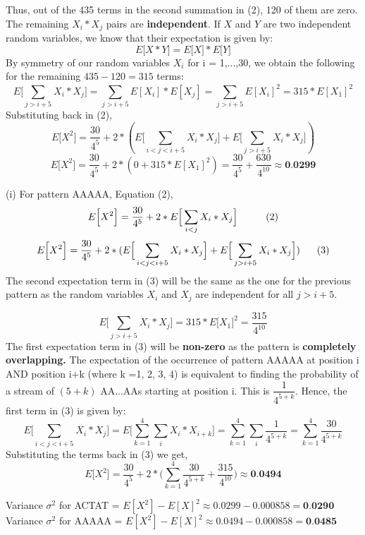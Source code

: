 \documentclass[solution,addpoints,12pt]{exam}
\begin{document}
\begin{questions}
\begin{parts}
\begin{solution}
Thus, out of the 435 terms in the second summation in (2), 120 of them are zero. The remaining $X_i*X_j$ pairs are \textbf{independent}. If $X$ and $Y$ are two independent random variables, we know that their expectation is given by:\\
$$E\Big[ X*Y\Big] = E\Big[X\Big]*E\Big[Y\Big]$$
By symmetry of our random variables $X_i$ for i = 1,...,30, we obtain the following for the remaining $435-120 = 315$ terms:
$$E\Big[ \sum_{j>i+5}{}^{} X_i*X_j] = \sum_{j>i+5}{} E[X_i]*E[X_j] = \sum_{j>i+5}^{} E[X_i]^2 = 315*E[X_1]^2$$
Substituting back in (2),
$$E\Big[ X^2\Big] = \dfrac{30}{4^5} + 2*(E\Big[\sum_{i < j < i + 5}{}^{} X_i*X_j\Big] + E\Big[\sum_{j>i+5}{}^{} X_i*X_j\Big])$$
$$E\Big[ X^2\Big] = \dfrac{30}{4^5} + 2*( 0 + 315*E[X_1]^2) = \dfrac{30}{4^5} + \dfrac{630}{4^{10}} \approx \textbf{0.0299}$$

(i) For pattern AAAAA,
Equation (2),
$$E\Big[X^2\Big] = \dfrac{30}{4^5} +  2*E\Big[\sum_{i < j}^{} X_i*X_j\Big]  \hspace{10mm} (2)$$
$$E\Big[X^2\Big] = \dfrac{30}{4^5} + 2*(E\Big[\sum_{i < j < i + 5}{}^{} X_i*X_j\Big] + E\Big[\sum_{j>i+5}{}^{} X_i*X_j\Big])  \hspace{6mm} (3)$$
The second expectation term in (3) will be the same as the one for the previous pattern as the random variables $X_i$ and $ X_j$ are independent for all $j>i+5$.

$$E\Big[\sum_{j>i+5}{}^{} X_i*X_j\Big] = 315*E\Big[X_1\Big]^2 = \dfrac{315}{4^{10}}$$ 
The first expectation term in (3) will be \textbf{non-zero} as the pattern is \textbf{completely overlapping.} The expectation of the occurrence of pattern AAAAA at position i AND position i+k (where k =1, 2, 3, 4) is equivalent to finding the probability of a stream of $(5+k)$ AA...AAs starting at position i. This is $\dfrac{1}{4^{5+k}}$. Hence, the first term in (3) is given by: 
$$E\Big[\sum_{i < j < i + 5}{}^{} X_i*X_j\Big] = E\Big[\sum_{k = 1}^{4} \sum_{i}^{}  X_i*X_{i+k}\Big] = \sum_{k = 1}^{4} \sum_{i}^{} \dfrac{1}{4^{5+k}} = \sum_{k = 1}^{4} \dfrac{30}{4^{5+k}}  $$
Substituting the terms back in (3) we get,
$$E\Big[X^2\Big] = \dfrac{30}{4^5} + 2*\bigg( \sum_{k = 1}^{4} \dfrac{30}{4^{5+k}} + \dfrac{315}{4^{10}}\bigg) \approx \textbf{0.0494}$$

Variance $\sigma^2$ for ACTAT = $E[X^2] -E[X]^2 \approx 0.0299 - 0.000858 = \textbf{0.0290}$\\
Variance $\sigma^2$ for AAAAA = $E[X^2] -E[X]^2 \approx 0.0494 - 0.000858 = \textbf{0.0485}$\\
 


\end{solution}
\end{parts}
\end{questions}
\end{document}
